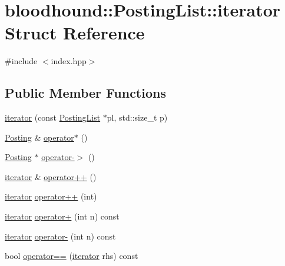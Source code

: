 \hypertarget{structbloodhound_1_1PostingList_1_1iterator}{}\section{bloodhound\+:\+:Posting\+List\+:\+:iterator Struct Reference}
\label{structbloodhound_1_1PostingList_1_1iterator}


{\ttfamily \#include $<$index.\+hpp$>$}

\subsection*{Public Member Functions}
\begin{DoxyCompactItemize}
\item 
\mbox{\hyperlink{structbloodhound_1_1PostingList_1_1iterator_af815248890d1f92dbd2cc3fa5813875a}{iterator}} (const \mbox{\hyperlink{classbloodhound_1_1PostingList}{Posting\+List}} $\ast$pl, std\+::size\+\_\+t p)
\item 
\mbox{\hyperlink{structbloodhound_1_1Posting}{Posting}} \& \mbox{\hyperlink{structbloodhound_1_1PostingList_1_1iterator_a386a2af6b962ddd85392f1313eb16eff}{operator$\ast$}} ()
\item 
\mbox{\hyperlink{structbloodhound_1_1Posting}{Posting}} $\ast$ \mbox{\hyperlink{structbloodhound_1_1PostingList_1_1iterator_a8c9120139692d6672b52d96301718614}{operator-\/$>$}} ()
\item 
\mbox{\hyperlink{structbloodhound_1_1PostingList_1_1iterator}{iterator}} \& \mbox{\hyperlink{structbloodhound_1_1PostingList_1_1iterator_a8b0c2e4221f0ce3ea893c2fc37edbd53}{operator++}} ()
\item 
\mbox{\hyperlink{structbloodhound_1_1PostingList_1_1iterator}{iterator}} \mbox{\hyperlink{structbloodhound_1_1PostingList_1_1iterator_a9923c5a81b77562a06a48562babcdc9b}{operator++}} (int)
\item 
\mbox{\hyperlink{structbloodhound_1_1PostingList_1_1iterator}{iterator}} \mbox{\hyperlink{structbloodhound_1_1PostingList_1_1iterator_a8672fb454e60ed068ae02078976543f9}{operator+}} (int n) const
\item 
\mbox{\hyperlink{structbloodhound_1_1PostingList_1_1iterator}{iterator}} \mbox{\hyperlink{structbloodhound_1_1PostingList_1_1iterator_a61a5de181ff84ddc0976957a7a9fcfd7}{operator-\/}} (int n) const
\item 
bool \mbox{\hyperlink{structbloodhound_1_1PostingList_1_1iterator_af82060f61f9231ee449e43ea347cab29}{operator==}} (\mbox{\hyperlink{structbloodhound_1_1PostingList_1_1iterator}{iterator}} rhs) const

\end{DoxyCompactItemize}
